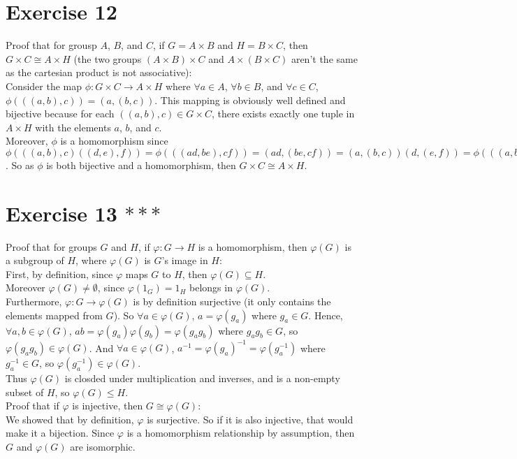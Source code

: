 \documentclass[12pt]{article}
\begin{document}
    \section*{Exercise 12}
    Proof that for grousp $A$, $B$, and $C$, if $G = A \times B$
    and $H = B \times C$, then $G \times C \cong A \times H$
    (the two groups $(A \times B) \times C$ and $A \times (B \times C)$
    aren't the same as the cartesian product is not associative): \\
    Consider the map $\phi: G \times C \to A \times H$
    where $\forall a \in A$, $\forall b \in B$, and $\forall c \in C$,
    $\phi(((a, b), c)) = (a, (b, c))$.
    This mapping is obviously well defined and bijective
    because for each $((a, b), c) \in G \times C$,
    there exists exactly one tuple in $A \times H$ with the elements
    $a$, $b$, and $c$. \\
    Moreover, $\phi$ is a homomorphism 
    since $\phi(((a, b), c)((d, e), f)) = \phi(((ad, be), cf))
    = (ad, (be, cf))
    = (a, (b, c))(d, (e, f))
    = \phi(((a, b), c))\phi(((d, e), f))$.
    So as $\phi$ is both bijective and a homomorphism,
    then $G \times C \cong A \times H$.


    \section*{Exercise 13 $***$}
    Proof that for groups $G$ and $H$,
    if $\varphi: G \to H$ is a homomorphism,
    then $\varphi(G)$ is a subgroup of $H$,
    where $\varphi(G)$ is $G$'s image in $H$: \\
    First, by definition, since $\varphi$ maps $G$ to $H$,
    then $\varphi(G) \subseteq H$. \\
    Moreover $\varphi(G) \neq \emptyset$,
    since $\varphi(1_G) = 1_H$ belongs in $\varphi(G)$. \\
    Furthermore, $\varphi: G \to \varphi(G)$ is by definition surjective
    (it only contains the elements mapped from $G$).
    So $\forall a \in \varphi(G)$, $a = \varphi(g_a)$ where $g_a \in G$.
    Hence, $\forall a, b \in \varphi(G)$,
    $ab = \varphi(g_a)\varphi(g_b) = \varphi(g_ag_b)$
    where $g_ag_b \in G$,
    so $\varphi(g_ag_b) \in \varphi(G)$.
    And $\forall a \in \varphi(G)$,
    $a^{-1} = \varphi(g_a)^{-1} = \varphi(g_a^{-1})$
    where $g_a^{-1} \in G$,
    so $\varphi(g_a^{-1}) \in \varphi(G)$. \\
    Thus $\varphi(G)$ is closded under multiplication and inverses,
    and is a non-empty subset of $H$,
    so $\varphi(G) \leqslant H$. \\
    Proof that if $\varphi$ is injective, then $G \cong \varphi(G)$: \\
    We showed that by definition, $\varphi$ is surjective.
    So if it is also injective, that would make it a bijection.
    Since $\varphi$ is a homomorphism relationship by assumption,
    then $G$ and $\varphi(G)$ are isomorphic.
\end{document}
